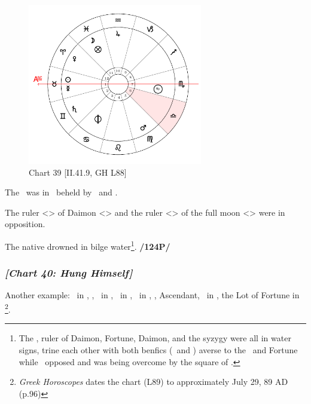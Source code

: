 \clearpage
\begin{figure}
\centering
\includegraphics[width=0.68\textwidth]{charts/2_41_9}
\caption{Chart 39 [II.41.9, GH L88]}
\label{fig:chart39}
\end{figure} 

The \Moon\, was in \Pisces\, beheld by \Saturn\, and \Mars. 

The ruler <\Moon> of Daimon <\Cancer> and the ruler <\Mars> of the full moon <\Scorpio> were in opposition. 

The native drowned in bilge water\footnote{The \Moon, ruler of Daimon, Fortune, Daimon, and the syzygy were all in water signs, trine each other with both benfics (\Venus\, and \Jupiter) averse to the \Moon\, and Fortune while \Mars\, opposed and was being overcome by the square of \Saturn.}. \textbf{/124P/} 
\newpage
\subsubsection{\textit{[Chart 40: Hung Himself]}}
Another example: \Sun\, in \Leo, \Moon, \Mercury\, in \Virgo, \Saturn\, in \Gemini, \Jupiter\, in \Aries, \Mars, Ascendant, \Venus\, in \Cancer, the Lot of Fortune in \Gemini
\footnote{\textit{Greek Horoscopes} dates the chart (L89) to approximately July 29, 89 AD (p.96)}. 

